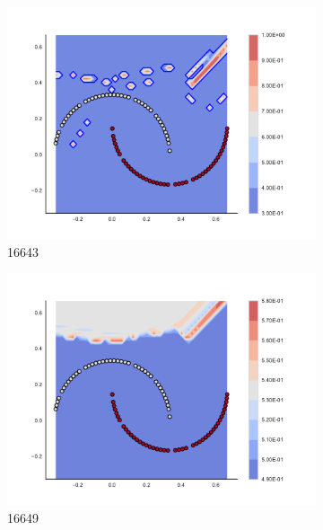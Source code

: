 \begin{figure}[h]
\begin{subfigure}[b]{0.09\textwidth}
    \includegraphics[clip, trim=2.35cm 1.75cm 4.5cm 0cm,width=\textwidth]{img/convergence/16643.pdf}
    \caption{16643}
    \label{fig:convergence_16643}
\end{subfigure}
%
\begin{subfigure}[b]{0.09\textwidth}
    \includegraphics[clip, trim=2.35cm 1.75cm 4.5cm 0cm,width=\textwidth]{img/convergence/16649.pdf}
    \caption{16649}
    \label{fig:convergence_16649}
\end{subfigure}
%
\begin{subfigure}[b]{0.09\textwidth}

\end{subfigure}
\end{figure}

